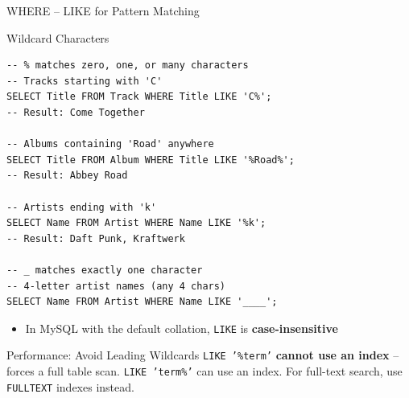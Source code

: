\begin{frame}[fragile]{WHERE -- LIKE for Pattern Matching}
  \begin{block}{Wildcard Characters}
\begin{lstlisting}[style=sqlstyle]
-- % matches zero, one, or many characters
-- Tracks starting with 'C'
SELECT Title FROM Track WHERE Title LIKE 'C%';
-- Result: Come Together

-- Albums containing 'Road' anywhere
SELECT Title FROM Album WHERE Title LIKE '%Road%';
-- Result: Abbey Road

-- Artists ending with 'k'
SELECT Name FROM Artist WHERE Name LIKE '%k';
-- Result: Daft Punk, Kraftwerk

-- _ matches exactly one character
-- 4-letter artist names (any 4 chars)
SELECT Name FROM Artist WHERE Name LIKE '____';
\end{lstlisting}
  \end{block}

  \begin{itemize}
    \item In MySQL with the default collation, \texttt{LIKE} is \textbf{case-insensitive}
  \end{itemize}

  \begin{alertblock}{Performance: Avoid Leading Wildcards}
    \texttt{LIKE '\%term'} \textbf{cannot use an index} -- forces a full table scan.
    \texttt{LIKE 'term\%'} can use an index. For full-text search, use
    \texttt{FULLTEXT} indexes instead.
  \end{alertblock}
\end{frame}

